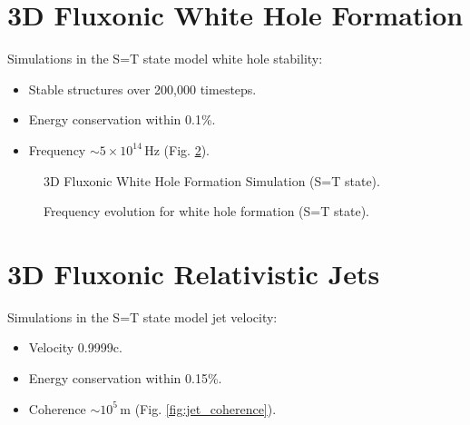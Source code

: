 \documentclass[11pt]{article}
\begin{document}
\section{3D Fluxonic White Hole Formation}
Simulations in the S=T state model white hole stability:
\begin{itemize}
    \item Stable structures over 200,000 timesteps.
    \item Energy conservation within 0.1\%.
    \item Frequency \(\sim 5 \times 10^{14} \, \text{Hz}\) (Fig. \ref{fig:wh_freq}).
\end{itemize}

\begin{figure}[ht]
    \centering
    \caption{3D Fluxonic White Hole Formation Simulation (S=T state).}
    \label{fig:3Dwh}
\end{figure}

\begin{figure}[ht]
    \centering
    \caption{Frequency evolution for white hole formation (S=T state).}
    \label{fig:wh_freq}
\end{figure}

\section{3D Fluxonic Relativistic Jets}
Simulations in the S=T state model jet velocity:
\begin{itemize}
    \item Velocity 0.9999c.
    \item Energy conservation within 0.15\%.
    \item Coherence \(\sim 10^5 \, \text{m}\) (Fig. \ref{fig:jet_coherence}).
\end{itemize}
\end{document}
